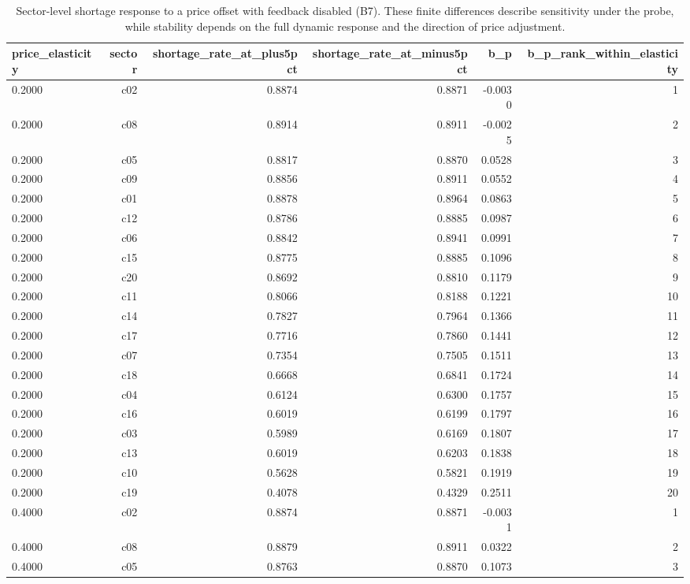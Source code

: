 \begin{table}[htbp]
\centering
\caption{Sector-level shortage response to a price offset with feedback disabled (B7). These finite differences describe sensitivity under the probe, while stability depends on the full dynamic response and the direction of price adjustment.}
\label{tab:bp_sector}
\begin{tabular}{lrrrrr}
\toprule
price\_elasticity & sector & shortage\_rate\_at\_plus5pct & shortage\_rate\_at\_minus5pct & b\_p & b\_p\_rank\_within\_elasticity \\
\midrule
0.2000 & c02 & 0.8874 & 0.8871 & -0.0030 & 1 \\
0.2000 & c08 & 0.8914 & 0.8911 & -0.0025 & 2 \\
0.2000 & c05 & 0.8817 & 0.8870 & 0.0528 & 3 \\
0.2000 & c09 & 0.8856 & 0.8911 & 0.0552 & 4 \\
0.2000 & c01 & 0.8878 & 0.8964 & 0.0863 & 5 \\
0.2000 & c12 & 0.8786 & 0.8885 & 0.0987 & 6 \\
0.2000 & c06 & 0.8842 & 0.8941 & 0.0991 & 7 \\
0.2000 & c15 & 0.8775 & 0.8885 & 0.1096 & 8 \\
0.2000 & c20 & 0.8692 & 0.8810 & 0.1179 & 9 \\
0.2000 & c11 & 0.8066 & 0.8188 & 0.1221 & 10 \\
0.2000 & c14 & 0.7827 & 0.7964 & 0.1366 & 11 \\
0.2000 & c17 & 0.7716 & 0.7860 & 0.1441 & 12 \\
0.2000 & c07 & 0.7354 & 0.7505 & 0.1511 & 13 \\
0.2000 & c18 & 0.6668 & 0.6841 & 0.1724 & 14 \\
0.2000 & c04 & 0.6124 & 0.6300 & 0.1757 & 15 \\
0.2000 & c16 & 0.6019 & 0.6199 & 0.1797 & 16 \\
0.2000 & c03 & 0.5989 & 0.6169 & 0.1807 & 17 \\
0.2000 & c13 & 0.6019 & 0.6203 & 0.1838 & 18 \\
0.2000 & c10 & 0.5628 & 0.5821 & 0.1919 & 19 \\
0.2000 & c19 & 0.4078 & 0.4329 & 0.2511 & 20 \\
0.4000 & c02 & 0.8874 & 0.8871 & -0.0031 & 1 \\
0.4000 & c08 & 0.8879 & 0.8911 & 0.0322 & 2 \\
0.4000 & c05 & 0.8763 & 0.8870 & 0.1073 & 3 \\

\end{tabular}
\end{table}
